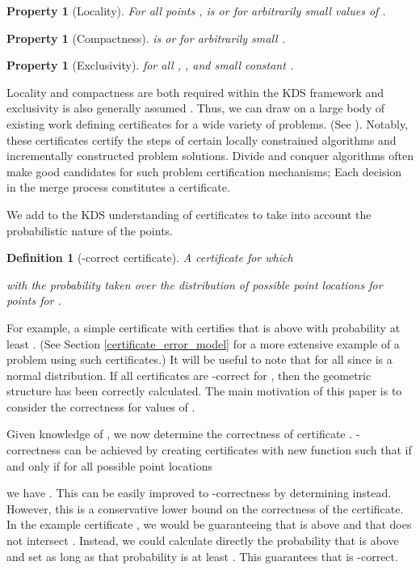 \documentclass[11pt]{article}
\newtheorem{definition}[theorem]{Definition}
\newtheorem{property}[theorem]{Property}
\begin{document}
\begin{property}[Locality]
\label{def:locality}
For all points ,  is  or  for arbitrarily small values of .
\end{property} 

\begin{property}[Compactness]
\label{def:compactness}
 is  or  for arbitrarily small .
\end{property}

\begin{property}[Exclusivity]
\label{def:exclusivity}
 for all , ,  and small constant .
\end{property}


Locality and compactness are both required within the KDS framework and exclusivity is also generally assumed \cite{Basch99MobileData}.  Thus, we can draw on a large body of existing work defining certificates for a wide variety of problems.  (See \cite{Guibas04Kinetic}).  Notably, these certificates certify the steps of certain locally constrained algorithms and incrementally constructed problem solutions.  Divide and conquer algorithms often make good candidates for such problem certification mechanisms; Each decision in the merge process constitutes a certificate.

We add to the KDS understanding of certificates to take into account the probabilistic nature of the points.  
\begin{definition}[-correct certificate]
\label{def:certificate}
A certificate  for which

with the probability taken over the distribution of possible point locations for points  for . 
\end{definition}

\noindent For example, a simple certificate  with  certifies that  is above  with probability at least .  (See Section \ref{certificate_error_model} for a more extensive example of a problem using such certificates.)  It will be useful to note that  for all  since  is a normal distribution.  If all certificates are -correct for , then the geometric structure  has been correctly calculated.  The main motivation of this paper is to consider the correctness for values of .

Given knowledge of , we now determine the correctness of certificate .  -correctness can be achieved by creating certificates  with new function  such that   if and only if for all possible point locations 

we have .  This can be easily improved to -correctness by determining  instead.  However, this is a conservative lower bound on the correctness of the certificate.  In the example certificate , we would be guaranteeing that  is above  and that  does not intersect .  Instead, we could calculate directly the probability that  is above  and set  as long as that probability is at least .  This guarantees that  is -correct.
 
\end{document}

